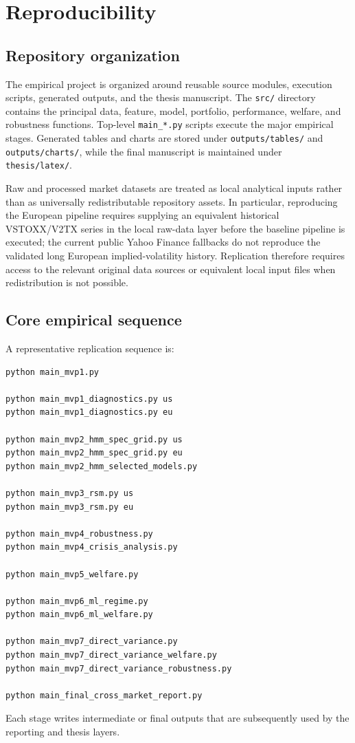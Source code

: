 \section{Reproducibility}
\label{app:reproducibility}

\subsection{Repository organization}

The empirical project is organized around reusable source modules, execution scripts, generated outputs, and the thesis manuscript. The \texttt{src/} directory contains the principal data, feature, model, portfolio, performance, welfare, and robustness functions. Top-level \texttt{main\_*.py} scripts execute the major empirical stages. Generated tables and charts are stored under \texttt{outputs/tables/} and \texttt{outputs/charts/}, while the final manuscript is maintained under \texttt{thesis/latex/}.

Raw and processed market datasets are treated as local analytical inputs rather than as universally redistributable repository assets. In particular, reproducing the European pipeline
requires supplying an equivalent historical VSTOXX/V2TX series in
the local raw-data layer before the baseline pipeline is executed;
the current public Yahoo Finance fallbacks do not reproduce the
validated long European implied-volatility history. Replication therefore requires access to the relevant original data sources or equivalent local input files when redistribution is not possible.

\subsection{Core empirical sequence}

A representative replication sequence is:

\begin{verbatim}
python main_mvp1.py

python main_mvp1_diagnostics.py us
python main_mvp1_diagnostics.py eu

python main_mvp2_hmm_spec_grid.py us
python main_mvp2_hmm_spec_grid.py eu
python main_mvp2_hmm_selected_models.py

python main_mvp3_rsm.py us
python main_mvp3_rsm.py eu

python main_mvp4_robustness.py
python main_mvp4_crisis_analysis.py

python main_mvp5_welfare.py

python main_mvp6_ml_regime.py
python main_mvp6_ml_welfare.py

python main_mvp7_direct_variance.py
python main_mvp7_direct_variance_welfare.py
python main_mvp7_direct_variance_robustness.py

python main_final_cross_market_report.py
\end{verbatim}

Each stage writes intermediate or final outputs that are subsequently used by the reporting and thesis layers.
